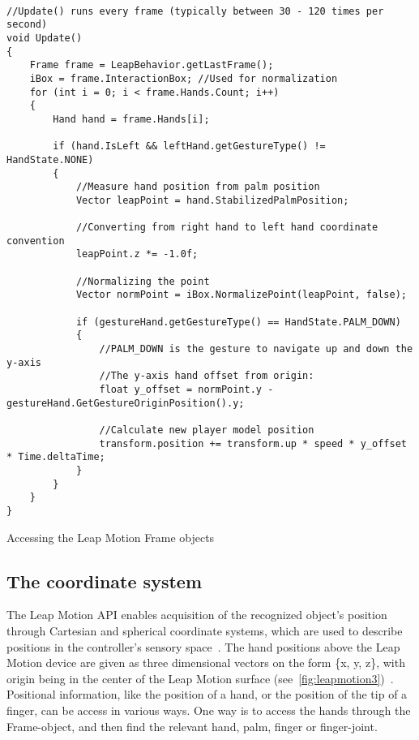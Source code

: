 \begin{table}
\label{table:annotation_visibility_code}
\lstset{style=csharp}
\begin{lstlisting}

//Update() runs every frame (typically between 30 - 120 times per second)
void Update()
{
    Frame frame = LeapBehavior.getLastFrame();
    iBox = frame.InteractionBox; //Used for normalization
    for (int i = 0; i < frame.Hands.Count; i++)
    {
        Hand hand = frame.Hands[i]; 

        if (hand.IsLeft && leftHand.getGestureType() != HandState.NONE)
        {
            //Measure hand position from palm position
            Vector leapPoint = hand.StabilizedPalmPosition;
            
            //Converting from right hand to left hand coordinate convention
            leapPoint.z *= -1.0f; 

            //Normalizing the point
            Vector normPoint = iBox.NormalizePoint(leapPoint, false);
            
            if (gestureHand.getGestureType() == HandState.PALM_DOWN) 
            {
                //PALM_DOWN is the gesture to navigate up and down the y-axis          
                //The y-axis hand offset from origin:
                float y_offset = normPoint.y - gestureHand.GetGestureOriginPosition().y;

                //Calculate new player model position
                transform.position += transform.up * speed * y_offset * Time.deltaTime;
            }             
        }
    }
}
\end{lstlisting}
\caption[Accessing the Leap Motion Frame objects]{Accessing the Leap Motion Frame objects}
\end{table}

\subsection{The coordinate system}
The Leap Motion API enables acquisition of the recognized object's position through Cartesian and spherical coordinate systems, 
which are used to describe positions in the controller's sensory space~\citep{Guna2014}. The hand positions above the Leap Motion device are given as three dimensional
vectors on the form \{x, y, z\}, with origin being in the center of the Leap Motion surface (see~\vref{fig:leapmotion3})~\citep{LeapMotion2016}.  
Positional information, like the position of a hand, or the position of the tip of a finger, can be access in various ways. One way is to access the hands through the
Frame-object, and then find the relevant hand, palm, finger or finger-joint.

